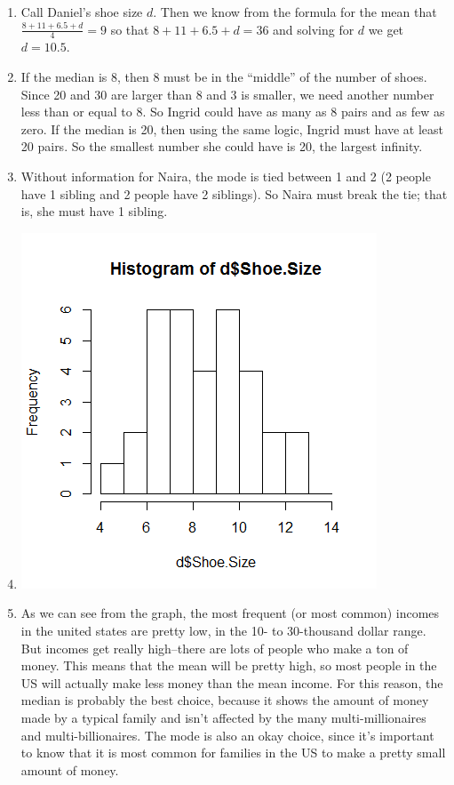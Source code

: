 \documentclass[12pt]{article}
\begin{document}
\begin{enumerate}
	\item Call Daniel's shoe size $d$. Then we know from the formula for the mean that $\frac{8 + 11 + 6.5 + d}{4} = 9$ so that $8 + 11 + 6.5 + d = 36$ and solving for $d$ we get $d = 10.5$.
	\item If the median is 8, then 8 must be in the ``middle'' of the number of shoes. Since 20 and 30 are larger than 8 and 3 is smaller, we need another number less than or equal to 8. So Ingrid could have as many as 8 pairs and as few as zero. If the median is 20, then using the same logic, Ingrid must have at least 20 pairs. So the smallest number she could have is 20, the largest infinity.
	\item Without information for Naira, the mode is tied between 1 and 2 (2 people have 1 sibling and 2 people have 2 siblings). So Naira must break the tie; that is, she must have 1 sibling.
	\item \includegraphics{hw4hist}
	\item As we can see from the graph, the most frequent (or most common) incomes in the united states are pretty low, in the 10- to 30-thousand dollar range. But incomes get really high--there are lots of people who make a ton of money. This means that the mean will be pretty high, so most people in the US will actually make less money than the mean income. For this reason, the median is probably the best choice, because it shows the amount of money made by a typical family and isn't affected by the many multi-millionaires and multi-billionaires. The mode is also an okay choice, since it's important to know that it is most common for families in the US to make a pretty small amount of money.
\end{enumerate}
\end{document}
